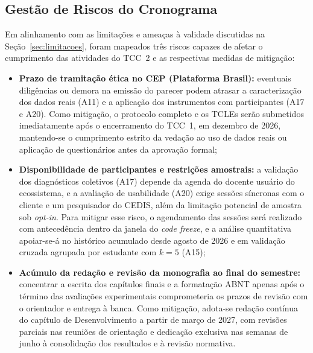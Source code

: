 \subsection{Gestão de Riscos do Cronograma}
\label{subsec:riscos-cronograma-tcc2}

Em alinhamento com as limitações e ameaças à validade discutidas na Seção~\ref{sec:limitacoes}, foram mapeados três riscos capazes de afetar o cumprimento das atividades do TCC~2 e as respectivas medidas de mitigação:

\begin{itemize}
    \item \textbf{Prazo de tramitação ética no CEP (Plataforma Brasil):} eventuais diligências ou demora na emissão do parecer podem atrasar a caracterização dos dados reais (A11) e a aplicação dos instrumentos com participantes (A17 e A20). Como mitigação, o protocolo completo e os TCLEs serão submetidos imediatamente após o encerramento do TCC~1, em dezembro de 2026, mantendo-se o cumprimento estrito da vedação ao uso de dados reais ou aplicação de questionários antes da aprovação formal;

    \item \textbf{Disponibilidade de participantes e restrições amostrais:} a validação dos diagnósticos coletivos (A17) depende da agenda do docente usuário do ecossistema, e a avaliação de usabilidade (A20) exige sessões síncronas com o cliente e um pesquisador do CEDIS, além da limitação potencial de amostra sob \textit{opt-in}. Para mitigar esse risco, o agendamento das sessões será realizado com antecedência dentro da janela do \textit{code freeze}, e a análise quantitativa apoiar-se-á no histórico acumulado desde agosto de 2026 e em validação cruzada agrupada por estudante com $k = 5$ (A15);

    \item \textbf{Acúmulo da redação e revisão da monografia ao final do semestre:} concentrar a escrita dos capítulos finais e a formatação ABNT apenas após o término das avaliações experimentais comprometeria os prazos de revisão com o orientador e entrega à banca. Como mitigação, adota-se redação contínua do capítulo de Desenvolvimento a partir de março de 2027, com revisões parciais nas reuniões de orientação e dedicação exclusiva nas semanas de junho à consolidação dos resultados e à revisão normativa.
\end{itemize}
